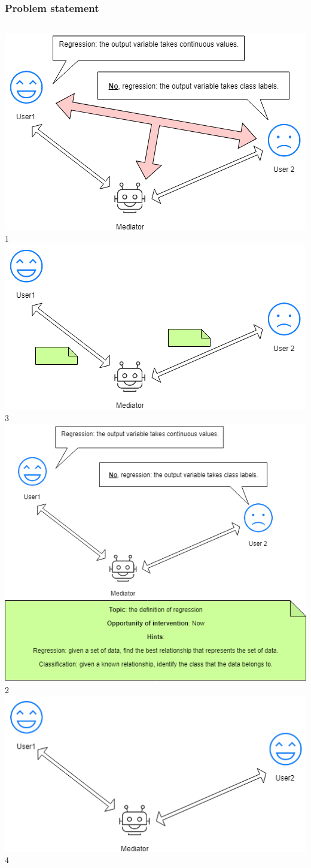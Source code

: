 \documentclass{beamer}
\begin{document}
\begin{frame}


\frametitle{Problem statement}


	   \begin{columns}[t]

	\includegraphics[width=.8\columnwidth]{p3}
 1
	\includegraphics[width=.8\columnwidth]{p5}
3
	\includegraphics[width=.8\columnwidth]{p4}
2
	\includegraphics[width=.8\columnwidth]{p6}
4

\end{columns}


\end{frame}
\end{document}
